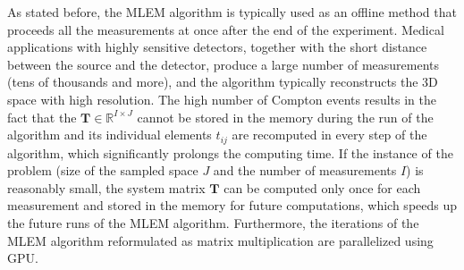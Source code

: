 As stated before, the \ac{MLEM} algorithm is typically used as an offline method that proceeds all the measurements at once after the end of the experiment.
Medical applications with highly sensitive detectors, together with the short distance between the source and the detector, produce a large number of measurements (tens of thousands and more), and the algorithm typically reconstructs the 3D space with high resolution.
The high number of Compton events results in the fact that the $\mathbf{T}\in \mathbb{R}^{I \times J}$ cannot be stored in the memory during the run of the algorithm and its individual elements $t_{ij}$ are recomputed in every step of the algorithm, which significantly prolongs the computing time.
If the instance of the problem (size of the sampled space $J$ and the number of measurements $I$) is reasonably small, the system matrix $\mathbf{T}$ can be computed only once for each measurement and stored in the memory for future computations, which speeds up the future runs of the \ac{MLEM} algorithm.
Furthermore, the iterations of the \ac{MLEM} algorithm reformulated as matrix multiplication are parallelized using \ac{GPU}.

